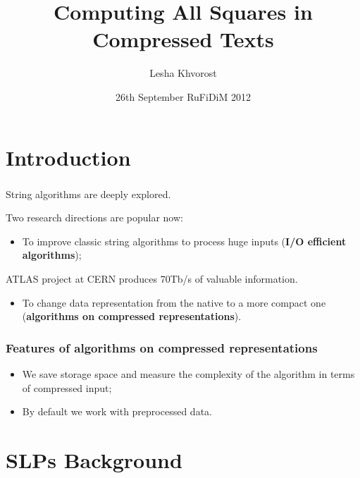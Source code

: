 \documentclass{beamer}
\title{Computing All Squares in Compressed Texts}
\author{Lesha Khvorost\inst{\mbox{\textdagger}}}
\institute
{
\inst{\mbox{\textdagger}}
Institute of Mathematics and Computer Science\\
Ural Federal University}
\date{26th September RuFiDiM 2012}
\begin{document}
\begin{frame}
\titlepage
\end{frame}

\section{Introduction}

\begin{frame}
\frametitle{}

\begin{block}{}
String algorithms are deeply explored.
\end{block}

\pause
Two research directions are popular now:

\begin{itemize}
  \item To improve classic string algorithms to process huge inputs (\textbf{I/O efficient algorithms});
\end{itemize}

\pause

\begin{block}{}
ATLAS project at CERN produces 70Tb/s of valuable information.
\end{block}

\pause

\begin{itemize}
  \item To change data representation from the native to a more compact one (\textbf{algorithms on compressed representations}).
\end{itemize}
\end{frame}

\begin{frame}
\frametitle{Features of algorithms on compressed representations}

\begin{itemize}
  \item We save storage space and measure the complexity of the algorithm in terms of compressed input;
  \pause
  \item By default we work with preprocessed data.
\end{itemize}

\end{frame}

\section{SLPs Background}
\end{document}
